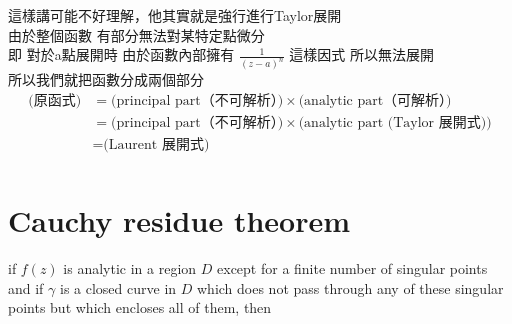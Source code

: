 \documentclass{article}
\begin{document}
這樣講可能不好理解，他其實就是強行進行Taylor展開\\
由於整個函數 有部分無法對某特定點微分\\
即 對於a點展開時 由於函數內部擁有 $\frac{1}{(z-a)^n}$ 這樣因式 所以無法展開\\ 
所以我們就把函數分成兩個部分\\
\begin{align*}
    \text{(原函式)} 
    &= \text{(principal part（不可解析）)} \times \text{(analytic part（可解析）)} \\
    &= \text{(principal part（不可解析）)} \times \text{(analytic part (Taylor 展開式))} \\
    &= \text{(Laurent 展開式)}\\
\end{align*}

\section{Cauchy residue theorem}
if $f(z)$ is analytic in a region $D$ except for a finite number of singular points and if $\gamma$ is a closed curve in $D$ which does not pass through any of these singular points but which encloses all of them, then
\end{document}
